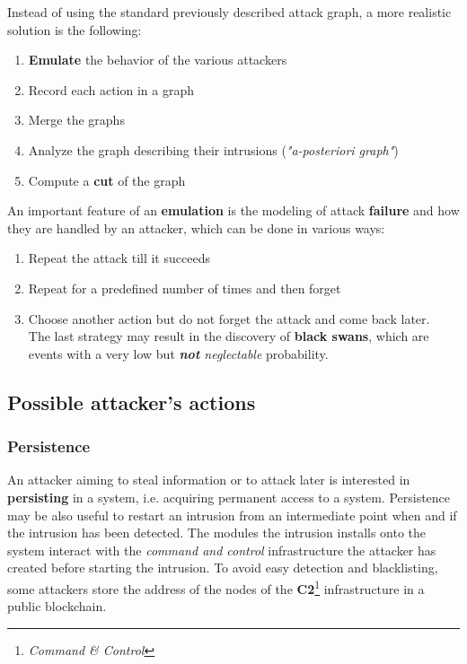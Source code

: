 Instead of using the standard previously described attack graph, a more realistic solution is the following:
\begin{enumerate}
   \item \textbf{Emulate} the behavior of the various attackers
   \item Record each action in a graph
   \item Merge the graphs
   \item Analyze the graph describing their intrusions (\textit{"a-posteriori graph"})
   \item Compute a \textbf{cut} of the graph
\end{enumerate}

An important feature of an \textbf{emulation} is the modeling of attack \textbf{failure} and
how they are handled by an attacker, which can be done in various ways:
\begin{enumerate}
   \item Repeat the attack till it succeeds
   \item Repeat for a predefined number of times and then forget
   \item Choose another action but do not forget the attack and come back later.\\
   The last strategy may result in the discovery of \textbf{black swans},
   which are events with a very low but \textit{\textbf{not} neglectable} probability.
\end{enumerate}

\subsection{Possible attacker's actions}
\subsubsection{Persistence}
An attacker aiming to steal information or to attack later is interested in \textbf{persisting} in a system, i.e. acquiring permanent access to a system.
Persistence may be also useful to restart an intrusion from an intermediate point when and if the intrusion has been detected.
The modules the intrusion installs onto the system interact with the \textit{command
and control} infrastructure the attacker has created before starting the
intrusion.
To avoid easy detection and blacklisting,
some attackers store the address of the nodes of the \textbf{C2}\footnote{\textit{Command \& Control}} infrastructure in a public blockchain.

